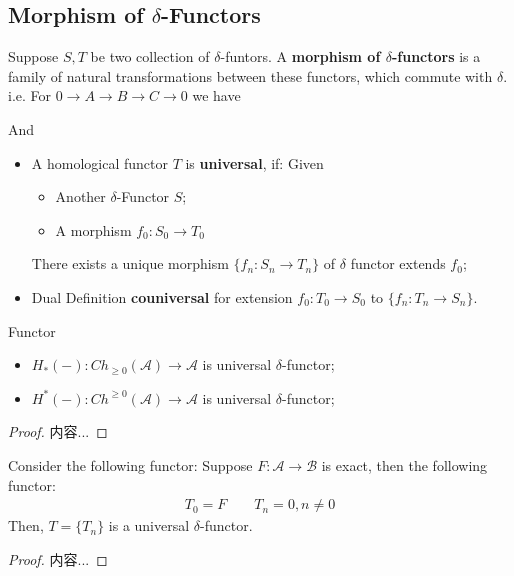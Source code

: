 \documentclass[Total.tex]{subfiles}
\begin{document}
			\subsection{Morphism of $\delta$-Functors}
			\begin{Def}
				Suppose $S,T$ be two collection of $\delta$-funtors. A \textbf{morphism of $\delta$-functors} is a family of natural transformations between these functors, which commute with $\delta$. i.e. For $0\rightarrow A\rightarrow B\rightarrow C\rightarrow 0$ we have
				\begin{center}
				\end{center}
			\end{Def}
			And
			\begin{Def}
				\begin{itemize}
					\item A homological functor $T$ is \textbf{universal}, if: Given
					\begin{itemize}
						\item Another $\delta$-Functor $S$;
						\item A morphism $f_0:S_0\rightarrow T_0$
					\end{itemize}
					There exists a unique morphism $\{f_n:S_n\rightarrow T_n\}$ of $\delta$ functor extends $f_0$;
					\item Dual Definition \textbf{couniversal} for extension $f_0:T_0\rightarrow S_0$ to $\{f_n:T_n\rightarrow S_n\}$.
				\end{itemize}
			\end{Def}
			
			\begin{proposition}
				Functor 
				\begin{itemize}
					\item $H_*(-):Ch_{\geq 0}(\mathcal{A})\rightarrow \mathcal{A}$ is universal $\delta$-functor;
					\item $H^*(-):Ch^{\geq 0}(\mathcal{A})\rightarrow \mathcal{A}$ is universal $\delta$-functor;
				\end{itemize}
			\end{proposition}
			\begin{proof}
				内容...
			\end{proof}
			\begin{proposition}
				Consider the following functor: Suppose $F:\mathcal{A}\rightarrow \mathcal{B}$ is exact, then the following functor:
				\begin{gather*}
					T_0=F\qquad T_n=0,n\not=0
				\end{gather*}
				Then, $T=\{T_n\}$ is a universal $\delta$-functor.
			\end{proposition}
			\begin{proof}
				内容...
			\end{proof}
		
\end{document}
